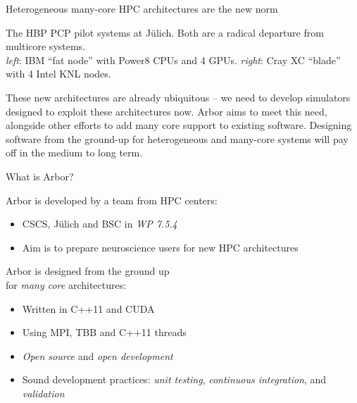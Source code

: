 \documentclass[a0paper,portrait]{baposter}
\newcommand{\arbor}{{\textcolor{blue!30!black}{Arbor}}\xspace}
\newcommand{\julich}{J\"ulich\xspace}
\newcommand{\newemph}[1]{{\color{blue}\em #1}}
\begin{document}
\begin{poster}
\begin{posterbox}[name=motivation,column=0,row=0,span=2]{Heterogeneous many-core  HPC architectures are the new norm}
    \begin{center}
        The HBP PCP pilot systems at \julich. Both are a radical departure from multicore systems. \\
        \newemph{left}: IBM ``fat node'' with Power8 CPUs and 4 GPUs. \newemph{right}: Cray XC ``blade'' with 4 Intel KNL nodes.
    \end{center}

    These new architectures are already ubiquitous -- we need to develop simulators designed to exploit these architectures now.
    \arbor aims to meet this need, alongside other efforts to add many core support to existing software.
    Designing software from the ground-up for heterogeneous and many-core systems will pay off in the medium to long term.
    \vspace{2pt}
\end{posterbox}

\begin{posterbox}[name=who,column=0,below=motivation,span=1]{What is \arbor?}
    \begin{center}
        \colorbox{yellow!20}{\arbor is developed by a team from HPC centers:}
    \end{center}
    \vspace{-9pt}
    \begin{itemize}
        \item CSCS, \julich and BSC in \newemph{WP 7.5.4}
        \item Aim is to prepare neuroscience users for new HPC architectures
    \end{itemize}
    \begin{center}
        \colorbox{yellow!20}{\arbor is designed from the ground up}\\
        \colorbox{yellow!20}{for \newemph{many core}  architectures:}
    \end{center}
    \vspace{-9pt}
    \begin{itemize}
        \item Written in C++11 and CUDA
        \item Using MPI, TBB and C++11 threads
        \item \newemph{Open source} and \newemph{open development}
        \item Sound development practices: \newemph{unit testing}, \newemph{continuous integration}, and \newemph{validation}
    \end{itemize}
    \vspace{-2pt}
\end{posterbox}


\end{poster}
\end{document}
